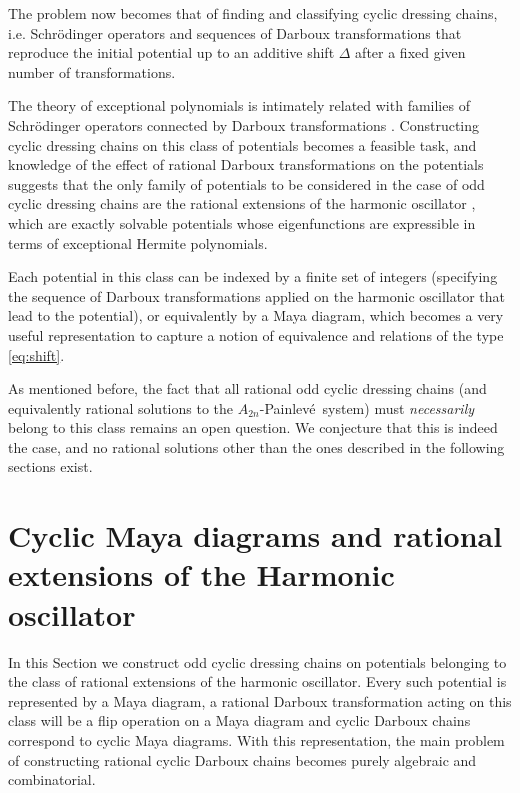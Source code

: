 \documentclass[10pt]{amsart}
\theoremstyle{definition}
\numberwithin{equation}{section}
\numberwithin{figure}{section}
\newcommand{\p}{Painlev\'{e}}
\begin{document}
The problem now becomes that of finding and classifying cyclic dressing chains, i.e. Schr\"{o}dinger operators and sequences of Darboux transformations that reproduce the initial potential up to an additive shift $\Delta$ after a fixed given number of transformations.

The theory of exceptional polynomials is intimately related with families of Schr\"{o}dinger operators connected by Darboux transformations \cite{gomez2013conjecture,garcia2016bochner}. Constructing cyclic dressing chains on this class of potentials becomes a feasible task, and knowledge of the effect of rational Darboux transformations on the potentials suggests that the only family of potentials to be considered in the case of odd cyclic dressing chains are the rational extensions of the harmonic oscillator \cite{gomez2013rational}, which are exactly solvable potentials whose eigenfunctions are expressible in terms of exceptional Hermite polynomials.

Each potential in this class can be indexed by a finite set of integers (specifying the sequence of Darboux transformations applied on the harmonic oscillator that lead to the potential), or equivalently by a Maya diagram, which becomes a  very useful representation to capture a notion of equivalence and relations of the type \eqref{eq:shift}.

As mentioned before, the fact that all rational odd cyclic dressing chains (and equivalently rational solutions to the $A_{2n}$-\p\ system) must \textit{necessarily} belong to this class remains an open question. We conjecture that this is indeed the case, and no  rational solutions other than the ones described in the following sections exist.

\section{Cyclic Maya diagrams and rational extensions of the Harmonic oscillator}\label{sec:Maya}

In this Section we construct odd cyclic dressing chains on potentials belonging to the class of rational extensions of the harmonic oscillator. Every such potential is represented by a Maya diagram, a rational Darboux transformation acting on this class will be a flip operation on a Maya diagram and cyclic Darboux chains correspond to cyclic Maya diagrams. With this representation, the main problem of constructing rational cyclic Darboux chains becomes purely algebraic and combinatorial.
\end{document}
